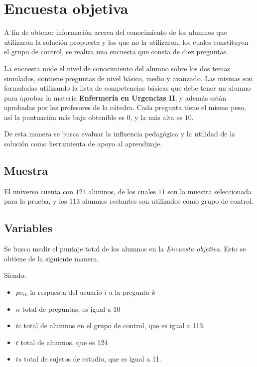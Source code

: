 \section{Encuesta objetiva}
\label{sec:objetiva}

A fin de obtener información acerca del conocimiento de los alumnos que utilizaron 
la solución propuesta y los que no la utilizaron, los cuales constituyen el grupo 
de control, se realiza una encuesta que consta de diez preguntas.

La encuesta mide el nivel de conocimiento del alumno sobre los dos temas
simulados, contiene preguntas de nivel básico, medio y avanzado. Las mismas son
formuladas utilizando la lista de competencias básicas que debe tener un alumno
para aprobar la materia \textbf{Enfermería en Urgencias II}, y además están
aprobadas por los profesores de la cátedra. Cada pregunta tiene el mismo peso, 
así la puntuación más baja obtenible es $0$, y la más alta es $10$.

De esta manera se busca evaluar la influencia pedagógica y la utilidad de la 
solución como herramienta de apoyo al aprendizaje.


\subsection{Muestra}

El universo cuenta con $124$ alumnos, de los cuales $11$ son la muestra seleccionada
para la prueba, y los $113$ alumnos restantes son utilizados
como grupo de control.

\subsection{Variables}

Se busca medir el puntaje total de los alumnos en la \emph{Encuesta objetiva}. Esto 
se obtiene de la siguiente manera.

Siendo:

\begin{itemize}
    \item $po_i{_k}$ la respuesta del usuario $i$ a la pregunta $k$
    \item $n$ total de preguntas, es igual a 10
    \item $tc$ total de alumnos en el grupo de control, que es igual a 113.
    \item $t$ total de alumnos, que es 124
    \item $ts$ total de sujetos de estudio, que es igual a 11.
\end{itemize}

